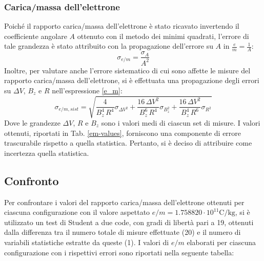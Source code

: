 \documentclass[]{article}
\let\oldsubsection\subsection%
\renewcommand{\subsection}{%
	\renewcommand{\theequation}{\thesubsection.\arabic{equation}}%
	\oldsubsection}%
\begin{document}
    \subsubsection{Carica/massa dell'elettrone}
    Poiché il rapporto carica/massa dell'elettrone è stato ricavato invertendo il coefficiente angolare $A$ ottenuto con il metodo dei minimi quadrati, l'errore di tale grandezza è stato attribuito con la propagazione dell'errore su $A$ in $\frac{e}{m}=\frac{1}{A}$:
    \begin{equation}
        \label{sigma_e/m}
        \sigma _{e/m} = \frac{\sigma_A}{A^2} 
    \end{equation}
    Inoltre, per valutare anche l'errore sistematico di cui sono affette le misure del rapporto carica/massa dell'elettrone, si è effettuata una propagazione degli errori su $\Delta V$, $B_z$ e $R$ nell'espressione \ref{e_m}:
    \begin{equation}
        \label{sigma_e/m_sist}
        \sigma _{e/m,sist} = \sqrt{ \frac{4}{B_z^4 \, R^4} \sigma_{\Delta V ^2} + \frac{16 \, \Delta V ^2}{B_z^6 \, R^4} \sigma_{B_z ^2} + \frac{16 \, \Delta V ^2}{B_z^4 \, R^6} \sigma_{R ^2}  }  
    \end{equation}
    Dove le grandezze $\Delta V$, $R$ e $B_z$ sono i valori medi di ciascun set di misure.
    I valori ottenuti, riportati in Tab. \ref{em-values}, forniscono una componente di errore trascurabile rispetto a quella statistica. Pertanto, si è deciso di attribuire come incertezza quella statistica.

    \subsection{Confronto}
    Per confrontare i valori del rapporto carica/massa dell'elettrone ottenuti per ciascuna configurazione con il valore aspettato
    $e/m = 1.758820 \cdot 10^{11}\text{C/kg}$, si è utilizzato un test di Student a due code, con gradi di libertà pari a 19, ottenuti dalla differenza tra il numero totale di misure effettuate (20) e il numero di variabili statistiche estratte da queste (1).
    I valori di $e/m$ elaborati per ciascuna configurazione con i rispettivi errori sono riportati nella seguente
    tabella:
\end{document}
